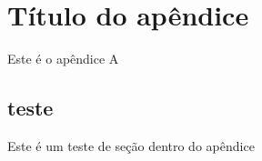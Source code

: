 \chapter{Título do apêndice}
Este é o apêndice A

\tocless\section{teste}
Este é um teste de seção dentro do apêndice

